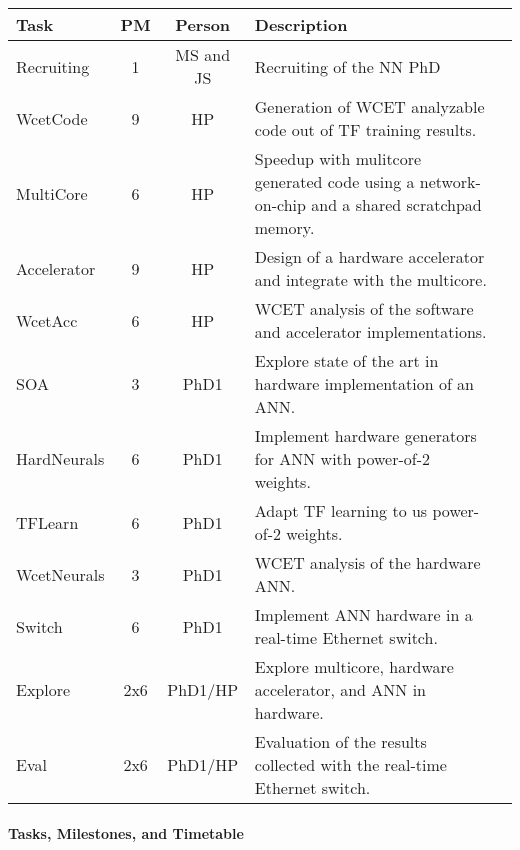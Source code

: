 \documentclass[fleqn,12pt]{article}
\begin{document}
\begin{table*}%
{\small
  \begin{center}
    \begin{tabular}{lccp{110mm}l}
      \toprule
      Task          & PM  & Person &  Description \\
      \midrule
      Recruiting  & 1 & MS and JS & Recruiting of the NN PhD \\
      \midrule
      WcetCode     &  9      & HP     & Generation of WCET analyzable code out of TF training results.\\
      MultiCore     &  6      & HP     & Speedup with mulitcore generated code using a network-on-chip and
      a shared scratchpad memory.\\
      Accelerator    &  9      & HP     & Design of a hardware accelerator and integrate with the multicore.\\
      WcetAcc     &  6      & HP     & WCET analysis of the software and accelerator implementations.\\
      \midrule
      SOA  & 3      & PhD1     &  Explore state of the art in hardware implementation of an ANN. \\
      HardNeurals  & 6      & PhD1     &  Implement hardware generators for ANN with power-of-2 weights. \\
      TFLearn  & 6      & PhD1     &  Adapt TF learning to us power-of-2 weights. \\
      WcetNeurals  & 3      & PhD1     &  WCET analysis of the hardware ANN. \\
      Switch  & 6      & PhD1     &  Implement ANN hardware in a real-time Ethernet switch. \\
      \midrule
      Explore   &    2x6 & PhD1/HP    &  Explore multicore, hardware accelerator, and ANN in hardware.\\
      Eval & 2x6 & PhD1/HP & Evaluation of the results collected with the real-time Ethernet switch. \\
      \bottomrule
    \end{tabular}
  \end{center}
}
\end{table*}

\paragraph*{Tasks, Milestones, and Timetable}
\end{document}
